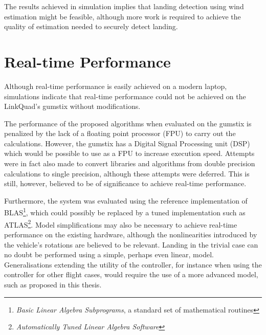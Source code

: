         The results achieved in simulation implies that landing detection
        using wind estimation might be feasible, although more work is required
        to achieve the quality of estimation needed to securely detect landing.
\pagebreak
    \section{Real-time Performance}
        Although real-time performance is easily achieved on a modern laptop,
        simulations indicate that real-time performance
        could not be achieved on the LinkQuad's gumstix without modifications.

        The performance of the proposed algorithms when evaluated on the
        gumstix is penalized by the lack of a floating point processor (FPU) to
        carry out the calculations. However, the gumstix has a
        Digital Signal Processing unit (DSP) which would be possible to
        use as a FPU to increase execution speed.
        Attempts were in fact also made to convert libraries and algorithms from
        double precision calculations to single precision, although these attempts were deferred.
        This is still, however, believed to be of significance to achieve real-time performance.

        Furthermore, the system was evaluated
        using the reference implementation of BLAS\footnote{\textit{Basic Linear Algebra Subprograms},
        a standard set of mathematical routines}, which could possibly
        be replaced by a tuned implementation such as ATLAS\footnote{\textit{Automatically Tuned Linear Algebra Software}}.
        Model simplifications may also be necessary to achieve real-time performance
        on the existing hardware, although the nonlinearities introduced by the vehicle's
        rotations are believed to be relevant.
        Landing in the trivial case can no doubt be performed using a simple, perhaps even linear, model.
        Generalisations extending the utility of the controller, for instance when
        using the controller for other flight cases, would require the use
        of a more advanced model, such as proposed in this thesis.
